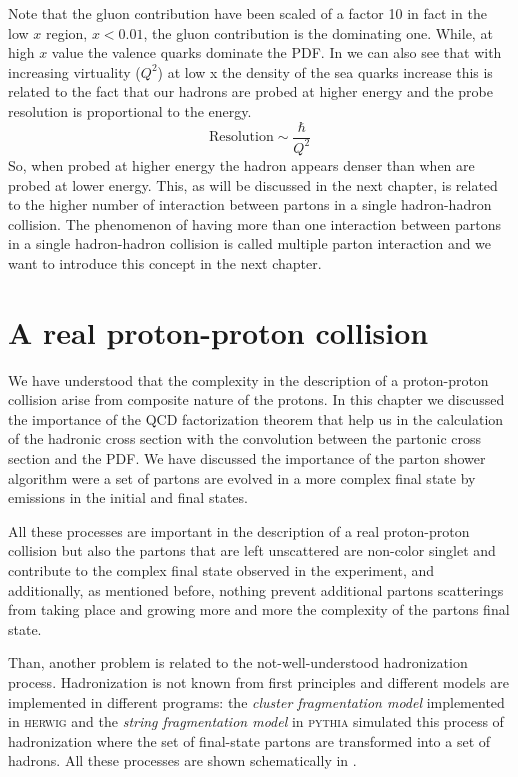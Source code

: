 Note that the gluon contribution have been scaled of a factor 10 in fact in the low $x$ region, $x<0.01$, the gluon contribution is the dominating one. While, at high $x$ value the valence quarks dominate the PDF. In  we can also see that with increasing virtuality ($Q^2$) at low x the density of the sea quarks increase this is related to the fact that our hadrons are probed at higher energy and the probe resolution is proportional to the energy. 
\begin{equation}
	\text{Resolution}\sim\frac{\hbar}{Q^2}
\end{equation}
So, when probed at higher energy the hadron appears denser than when are probed at lower energy. This, as will be discussed in the next chapter, is related to the higher number of interaction between partons in a single hadron-hadron collision. The phenomenon of having more than one interaction between partons in a single hadron-hadron collision is called multiple parton interaction and we want to introduce this concept in the next chapter.


\section{A real proton-proton collision}

We have understood that the complexity in the description of a proton-proton collision arise from composite nature of the protons. In this chapter we discussed the importance of the QCD factorization theorem that help us in the calculation of the hadronic cross section with the convolution between the partonic cross section and the PDF. We have discussed the importance of the parton shower algorithm were a set of partons are evolved in a more complex final state by emissions in the initial and final states.

All these processes are important in the description of a real proton-proton collision but also the partons that are left unscattered are non-color singlet and contribute to the complex final state observed in the experiment, and additionally, as mentioned before, nothing prevent additional partons scatterings from taking place and growing more and more the complexity of the partons final state. 

Than, another problem is related to the not-well-understood hadronization process.
Hadronization is not known from first principles and different models are implemented in different programs: the \textit{cluster fragmentation model} implemented in \textsc{herwig} and the \textit{string fragmentation model} in \textsc{pythia} simulated this process of hadronization where the set of final-state partons are transformed into a set of hadrons. All these processes are shown schematically in .

